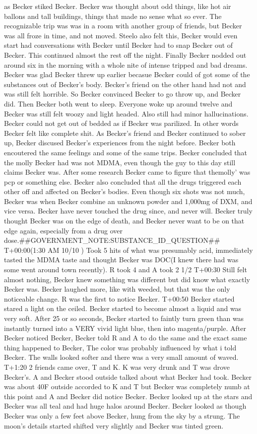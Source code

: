 \documentclass[12pt]{book}
\begin{document}
as Becker stiked Becker. Becker was thought about odd things, like hot air ballons and tall buildings, things that made no sense what so ever. The recognizable trip was was in a room with another group of friends, but Becker was all froze in time, and not moved. Steelo also felt this, Becker would even start had conversations with Becker until Becker had to snap Becker out of Becker. This continued almost the rest off the night. Finally Becker nodded out around six in the morning with a whole nite of intense tripped and bad dreams. Becker was glad Becker threw up earlier becasue Becker could of got some of the substances out of Becker's body. Becker's friend on the other hand had not and was still felt horrible. So Becker convinced Becker to go throw up, and Becker did. Then Becker both went to sleep. Everyone woke up around twelve and Becker was still felt woozy and light headed. Also still had minor hallucinations. Becker could not get out of bedded as if Becker was parilized. In other words Becker felt like complete shit. As Becker's friend and Becker continued to sober up, Becker discused Becker's experiences from the night before. Becker both encoutered the same feelings and some of the same trips. Becker concluded that the molly Becker had was not MDMA, even though the guy to this day still claims Becker was. After some research Becker came to figure that themolly' was pcp or something else. Becker also concluded that all the drugs triggered each other off and affected on Becker's bodies. Even though six shots was not much, Becker was when Becker combine an unknown powder and 1,000mg of DXM, and vice versa. Becker have never touched the drug since, and never will. Becker truly thought Becker was on the edge of death, and Becker never want to be on that edge again, especially from a drug over dose.\#\#GOVERNMENT\_NOTE:SUBSTANCE\_ID\_QUESTION\#\# T+00:00(1:30 AM 10/10 ) Took 5 hits of what was presumably acid, immediately tasted the MDMA taste and thought Becker was DOC(I knew there had was some went around town recently). R took 4 and A took 2 1/2 T+00:30 Still felt almost nothing, Becker knew something was different but did know what exactly Becker was. Becker laughed more, like with weeded, but that was the only noticeable change. R was the first to notice Becker. T+00:50 Becker started stared a light on the ceiled. Becker started to become almost a liquid and was very soft. After 25 or so seconds, Becker started to faintly turn green than was instantly turned into a VERY vivid light blue, then into magenta/purple. After Becker noticed Becker, Becker told R and A to do the same and the exact same thing happened to Becker, The color was probably influenced by what i told Becker. The walls looked softer and there was a very small amount of waved. T+1:20 2 friends came over, T and K. K was very drunk and T was drove Becker's. A and Becker stood outside talked about what Becker had took. Becker was about 40F outside accorded to K and T but Becker was completely numb at this point and A and Becker did notice Becker. Becker looked up at the stars and Becker was all teal and had huge halos around Becker. Becker looked as though Becker was only a few feet above Becker, hung from the sky by a strung. The moon's details started shifted very slightly and Becker was tinted green. 
\end{document}
